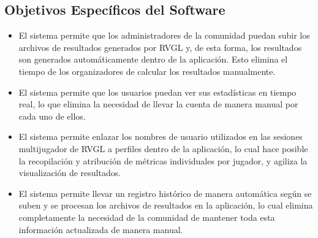 \subsection{Objetivos Específicos del Software}
\begin{itemize}
	\item El sistema permite que los administradores de la comunidad puedan subir los archivos de resultados generados por RVGL y, de esta forma, los resultados son generados automáticamente dentro de la aplicación. Esto elimina el tiempo de los organizadores de calcular los resultados manualmente.
	\item El sistema permite que los usuarios puedan ver sus estadísticas en tiempo real, lo que elimina la necesidad de llevar la cuenta de manera manual por cada uno de ellos.
	\item El sistema permite enlazar los nombres de usuario utilizados en las sesiones multijugador de RVGL a perfiles dentro de la aplicación, lo cual hace posible la recopilación y atribución de métricas individuales por jugador, y agiliza la visualización de resultados.
	\item El sistema permite llevar un registro histórico de manera automática según se suben y se procesan los archivos de resultados en la aplicación, lo cual elimina completamente la necesidad de la comunidad de mantener toda esta información actualizada de manera manual.
\end{itemize}


